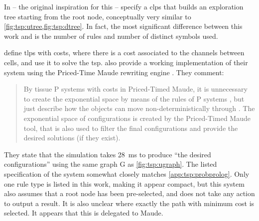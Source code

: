 
In \cite{Guo2017} -- the original inspiration for this  -- \citeauthor{Guo2017} specify a \gls{clps} that builds an exploration tree starting from the root node, conceptually very similar to \cref{fig:tsp:utree,fig:tsp:dtree}.  In fact, the most significant difference between this work and \cite{Guo2017} is the number of rules and number of distinct symbols used.



\citeauthor{Aman2021} \cite{Aman2021} define \gls{tlps} with costs, where there is a cost associated to the channels between cells, and use it to solve the \gls{tsp}.
\citeauthor{Aman2021} also provide a working implementation of their system using the Priced-Time Maude rewriting engine \cite{Bendiksen2009}.  They comment: \blockquote{By  tissue P systems with costs in Priced-Timed Maude, it is unnecessary to create the exponential space by means of the rules of P systems , but just describe how the objects can move non-deterministically through .  The exponential space of configurations is created by \textelp{} the Priced-Timed Maude tool, that is also used to filter the final configurations and provide the desired solutions (if they exist).}
They state that the simulation takes \qty{28}{\milli\second} to produce \enquote{the desired configurations} using the same graph G as \cref{fig:tsp:ugraph}.  The listed specification of the system somewhat closely matches \cref{app:tsp:probprolog}.
Only one rule type is listed in this work, making it appear compact, but this system also assumes that a root node has been pre-selected, and does not take any action to output a result.  It is also unclear where exactly the path with minimum cost is selected.  It appears that this is delegated to Maude.

